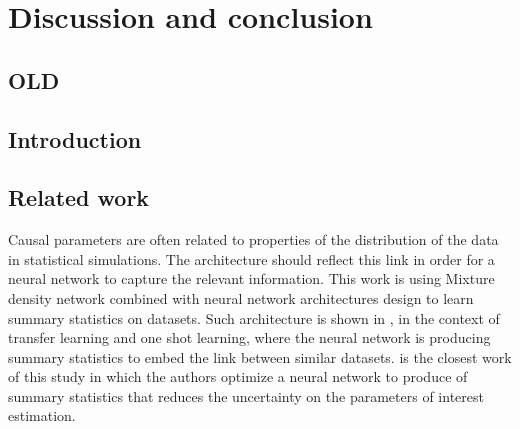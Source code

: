 
\chapter{Discussion and conclusion}
\label{chap:conclusion}
\ifpdf
    \graphicspath{{Chapter5/Figs/Raster/}{Chapter5/Figs/PDF/}{Chapter5/Figs/}}
\else
    \graphicspath{{Chapter5/Figs/Vector/}{Chapter5/Figs/}}
\fi



\section{OLD} %


\section{Introduction}


\section{Related work}




Causal parameters are often related to properties of the distribution of the data in statistical simulations.
The architecture should reflect this link in order for a neural network to capture the relevant information.
This work is using Mixture density network \cite{Bishop94mixturedensity} combined with neural network architectures design to learn summary statistics on datasets.
Such architecture is shown in \cite{Edwards17neuralstatistician}, in the context of transfer learning and one shot learning, where the neural network is producing summary statistics to embed the link between similar datasets.
\cite{DECASTRO2019170inferno} is the closest work of this study in which the authors optimize a neural network to produce of summary statistics that reduces the uncertainty on the parameters of interest estimation.







